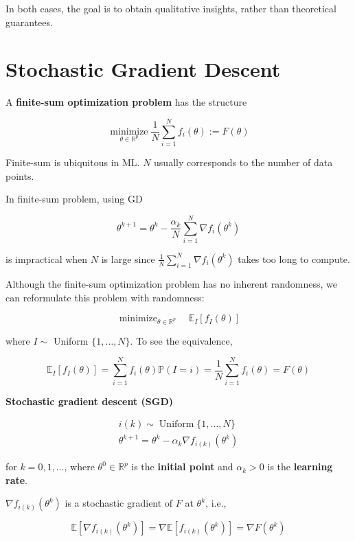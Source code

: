 In both cases, the goal is to obtain qualitative insights, rather than theoretical guarantees.

\section{Stochastic Gradient Descent}

\begin{definition}
    A \textbf{finite-sum optimization problem} has the structure

    $$
    \underset{\theta \in \mathbb{R}^{p}}{\operatorname{minimize}} \frac{1}{N} \sum_{i=1}^{N} f_{i}(\theta):=F(\theta)
    $$

    Finite-sum is ubiquitous in ML. $N$ usually corresponds to the number of data points.
\end{definition}

In finite-sum problem, using GD

$$
\theta^{k+1}=\theta^{k}-\frac{\alpha_{k}}{N} \sum_{i=1}^{N} \nabla f_{i}\left(\theta^{k}\right)
$$

is impractical when $N$ is large since $\frac{1}{N} \sum_{i=1}^{N} \nabla f_{i}\left(\theta^{k}\right)$ takes too long to compute.

\begin{concept}
    Although the finite-sum optimization problem has no inherent randomness, we can reformulate this problem with randomness:

    $$
    \operatorname{minimize}_{\theta \in \mathbb{R}^{p}} \quad \mathbb{E}_{I}\left[f_{I}(\theta)\right]
    $$

    where $I \sim$ Uniform $\{1, \ldots, N\}$. To see the equivalence,

    $$
    \mathbb{E}_{I}\left[f_{I}(\theta)\right]=\sum_{i=1}^{N} f_{i}(\theta) \mathbb{P}(I=i)=\frac{1}{N} \sum_{i=1}^{N} f_{i}(\theta)=F(\theta)
    $$
\end{concept}

\begin{definition}
    \textbf{Stochastic gradient descent (SGD)}

    $$
    \begin{gathered}
    i(k) \sim \operatorname{Uniform}\{1, \ldots, N\} \\
    \theta^{k+1}=\theta^{k}-\alpha_{k} \nabla f_{i(k)}\left(\theta^{k}\right)
    \end{gathered}
    $$

    for $k=0,1, \ldots$, where $\theta^{0} \in \mathbb{R}^{p}$ is the \textbf{initial point} and $\alpha_{k}>0$ is the \textbf{learning rate}.

    $\nabla f_{i(k)}\left(\theta^{k}\right)$ is a stochastic gradient of $F$ at $\theta^{k}$, i.e.,

    $$
    \mathbb{E}\left[\nabla f_{i(k)}\left(\theta^{k}\right)\right]=\nabla \mathbb{E}\left[f_{i(k)}\left(\theta^{k}\right)\right]=\nabla F\left(\theta^{k}\right)
    $$
\end{definition}

